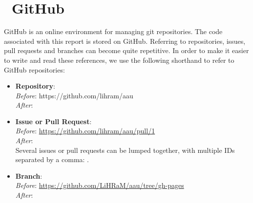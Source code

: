 \section*{\faGithub~GitHub}
GitHub is an online environment for managing git repositories.
The code associated with this report is stored on GitHub.
Referring to repositories, issues, pull requests and branches can become quite repetitive.
In order to make it easier to write and read these references, we use the following shorthand to refer to GitHub repositories:
\begin{itemize}
      \item{
            \textbf{Repository}: \\
            \textit{Before}: https://github.com/lihram/aau\\
            \textit{After}: 
            }
      \item{
            \textbf{Issue or Pull Request}: \\
            \textit{Before}: \url{https://github.com/lihram/aau/pull/1}\\
            \textit{After}: \\
            Several issues or pull requests can be lumped together, with multiple IDs separated by a comma: .
            }
      \item{
            \textbf{Branch}: \\
            \textit{Before}: \url{https://github.com/LiHRaM/aau/tree/gh-pages}\\
            \textit{After}: 
            }
\end{itemize}

\listoftodos{}

